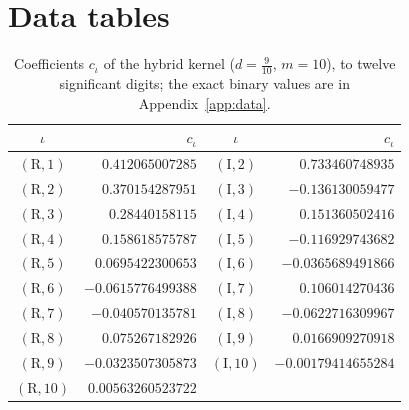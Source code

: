 \documentclass[11pt,reqno]{amsart}
\numberwithin{equation}{section}
\theoremstyle{definition}
\theoremstyle{remark}
\begin{document}
\clearpage
\appendix
\section{Data tables}\label{app:tables}
\begin{table}[ht]\centering\small
\begin{tabular}{@{}cr@{\quad}cr@{}}\toprule $\iota$ & $c_\iota$ & $\iota$ & $c_\iota$\\\midrule
$(\mathrm R,1)$ & $0.412065007285$ & $(\mathrm I,2)$ & $0.733460748935$\\
$(\mathrm R,2)$ & $0.370154287951$ & $(\mathrm I,3)$ & $-0.136130059477$\\
$(\mathrm R,3)$ & $0.28440158115$ & $(\mathrm I,4)$ & $0.151360502416$\\
$(\mathrm R,4)$ & $0.158618575787$ & $(\mathrm I,5)$ & $-0.116929743682$\\
$(\mathrm R,5)$ & $0.0695422300653$ & $(\mathrm I,6)$ & $-0.0365689491866$\\
$(\mathrm R,6)$ & $-0.0615776499388$ & $(\mathrm I,7)$ & $0.106014270436$\\
$(\mathrm R,7)$ & $-0.040570135781$ & $(\mathrm I,8)$ & $-0.0622716309967$\\
$(\mathrm R,8)$ & $0.075267182926$ & $(\mathrm I,9)$ & $0.0166909270918$\\
$(\mathrm R,9)$ & $-0.0323507305873$ & $(\mathrm I,10)$ & $-0.00179414655284$\\
$(\mathrm R,10)$ & $0.00563260523722$ & & \\
\bottomrule\end{tabular}
\caption{Coefficients $c_\iota$ of the hybrid kernel ($d=\frac9{10}$, $m=10$), to twelve significant digits; the exact binary values are in Appendix~\ref{app:data}.}\label{tab:hybrid_kernel}\end{table}
\end{document}
